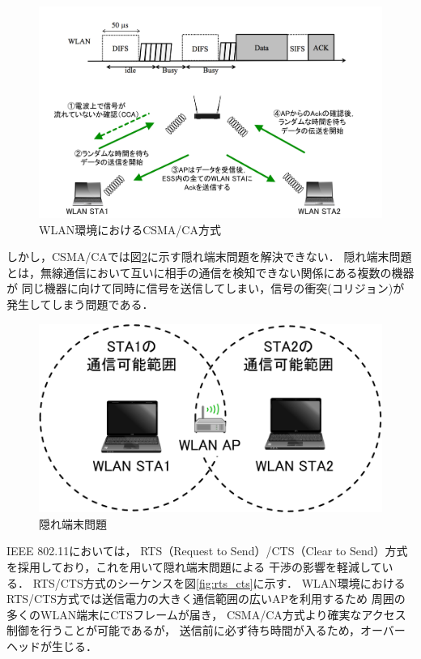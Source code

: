 \documentclass[12pt]{jreport}
\begin{document}
\begin{figure}[bt]
 \centering
 \includegraphics[width=\columnwidth]{figure/csma_ca_wlan.pdf}
 \caption{WLAN環境におけるCSMA/CA方式}
 \label{fig:csma_ca_wlan}
\end{figure}

しかし，CSMA/CAでは図\ref{fig:hidden_device}に示す隠れ端末問題を解決できない．
隠れ端末問題とは，無線通信において互いに相手の通信を検知できない関係にある複数の機器が
同じ機器に向けて同時に信号を送信してしまい，信号の衝突(コリジョン)が発生してしまう問題である．

\begin{figure}[bt]
 \centering
 \includegraphics[width=\columnwidth]{figure/hidden_device.pdf}
 \caption{隠れ端末問題}
 \label{fig:hidden_device}
\end{figure}

IEEE 802.11においては，
RTS（Request to Send）/CTS（Clear to Send）方式を採用しており，これを用いて隠れ端末問題による
干渉の影響を軽減している．
RTS/CTS方式のシーケンスを図\ref{fig:rts_cts}に示す．
WLAN環境におけるRTS/CTS方式では送信電力の大きく通信範囲の広いAPを利用するため
周囲の多くのWLAN端末にCTSフレームが届き，
CSMA/CA方式より確実なアクセス制御を行うことが可能であるが，
送信前に必ず待ち時間が入るため，オーバーヘッドが生じる．
\end{document}

